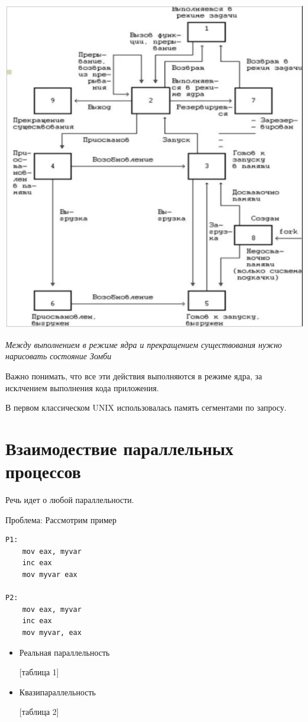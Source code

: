 \documentclass[14pt, a4paper]{article}
\begin{document}
	\includegraphics[width=\linewidth]{2}
	
	{\it Между выполнением в режиме ядра и прекращением существования нужно нарисовать состояние Зомби}
	
	Важно понимать, что все эти действия выполняются в режиме ядра, за исклчением выполнения кода приложения.
	
	В первом классическом UNIX использовалась память сегментами по запросу.
	
	\section*{Взаимодествие параллельных процессов}
	
	Речь идет о любой параллельности.
	
	Проблема: Рассмотрим пример
	
	\begin{lstlisting}
P1:
	mov eax, myvar
	inc eax
	mov myvar eax

P2:
	mov eax, myvar
	inc eax
	mov myvar, eax
	\end{lstlisting}

	\begin{itemize}
		\item Реальная параллельность
		
		[таблица 1]
		
		\item Квазипараллельность
		
		[таблица 2]
	\end{itemize}
\end{document}
